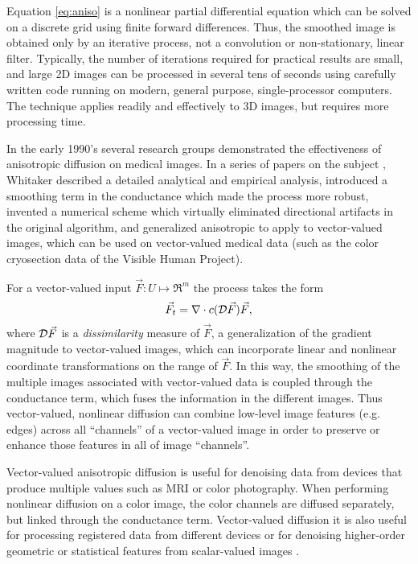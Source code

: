 Equation \ref{eq:aniso} is a nonlinear partial differential equation which can
be solved on a discrete grid using finite forward differences.  Thus, the
smoothed image is obtained only by an iterative process, not a convolution or
non-stationary, linear filter.  Typically, the number of iterations required
for practical results are small, and large 2D images can be processed in
several tens of seconds using carefully written code running on modern, general
purpose, single-processor computers.  The technique applies readily and
effectively to 3D images, but requires more processing time.

In the early 1990's several research groups \cite{Gerig1991,Whitaker1993d}
demonstrated the effectiveness of anisotropic diffusion on medical images.  In
a series of papers on the subject
\cite{Whitaker1993,Whitaker1993b,Whitaker1993c,Whitaker1993d,Whitaker-thesis,Whitaker1994},
Whitaker described a detailed analytical and empirical analysis, introduced a
smoothing term in the conductance which made the process more robust, invented
a numerical scheme which virtually eliminated directional artifacts in the
original algorithm, and generalized anisotropic to apply to vector-valued
images, which can be used on vector-valued medical data (such as the color
cryosection data of the Visible Human Project).

For a vector-valued input $\vec{F}:U \mapsto \Re^{m}$ the process takes the
form \begin{equation} \vec{F}_{t} = \nabla \cdot c({\cal D}\vec{F}) \vec{F},
\label{eq:vector_diff} \end{equation} where ${\cal D}\vec{F}$ is a {\em
dissimilarity} measure of $\vec{F}$, a generalization of the gradient magnitude
to vector-valued images, which can incorporate linear and nonlinear coordinate
transformations on the range of $\vec{F}$.  In this way, the smoothing of the
multiple images associated with vector-valued data is coupled through the
conductance term, which fuses the information in the different images.  Thus
vector-valued, nonlinear diffusion can combine low-level image features (e.g.
edges) across all ``channels'' of a vector-valued image in order to preserve or
enhance those features in all of image ``channels''.

Vector-valued anisotropic diffusion is useful for denoising data from devices
that produce multiple values such as MRI or color photography.  When performing
nonlinear diffusion on a color image, the color channels are diffused
separately, but linked through the conductance term. Vector-valued diffusion it
is also useful for processing registered data from different devices or for
denoising higher-order geometric or statistical features from scalar-valued
images \cite{Whitaker1994,Yoo1993}.


